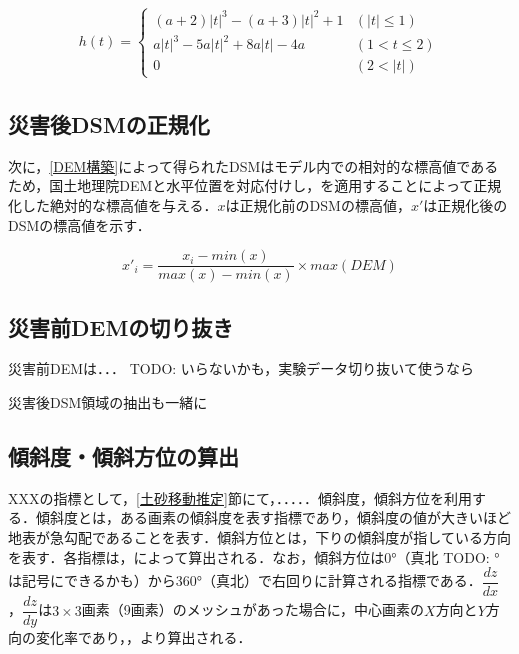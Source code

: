           \begin{eqnarray}
            \label{バイキュービック法3}
              h(t) = 
              \left\{
                \begin{array}{ll}
                  (a + 2) |t|^3 - (a + 3)|t|^2 + 1 & (|t| \leq 1)   \\
                  a|t|^3 - 5a|t|^2 + 8a|t| - 4a    & (1 < t \leq 2) \\
                  0                                & (2 < |t|)
                \end{array}
              \right.
            \end{eqnarray}

    \subsection{災害後DSMの正規化}
      次に，\ref{DEM構築}によって得られたDSMはモデル内での相対的な標高値であるため，国土地理院DEMと水平位置を対応付けし，を適用することによって正規化した絶対的な標高値を与える．$x$は正規化前のDSMの標高値，$x'$は正規化後のDSMの標高値を示す．

      \begin{equation}
        \label{正規化}
        x'_{i} = \dfrac{x_{i} - min(x)} {max(x) - min(x)} \times max(DEM) 
      \end{equation}
  
    \subsection{災害前DEMの切り抜き}
      災害前DEMは．．．
      TODO: いらないかも，実験データ切り抜いて使うなら

      災害後DSM領域の抽出も一緒に

    \subsection{傾斜度・傾斜方位の算出}
      XXXの指標として，\ref{土砂移動推定}節にて，．．．．．傾斜度，傾斜方位を利用する．傾斜度とは，ある画素の傾斜度を表す指標であり，傾斜度の値が大きいほど地表が急勾配であることを表す．傾斜方位とは，下りの傾斜度が指している方向を表す．各指標は，によって算出される．なお，傾斜方位は0°（真北 TODO: °は記号にできるかも）から360°（真北）で右回りに計算される指標である．$\dfrac{dz}{dx}$，$\dfrac{dz}{dy}$は$3 \times 3$画素（9画素）のメッシュがあった場合に，中心画素の$X$方向と$Y$方向の変化率であり，，より算出される．

